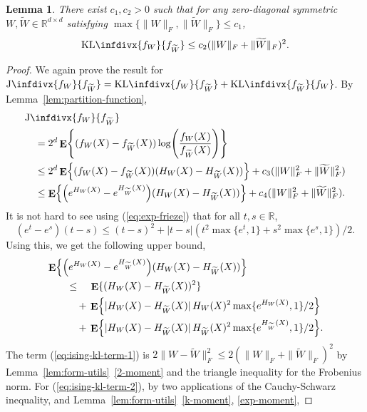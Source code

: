 \documentclass[letterpaper]{amsart}
\newcommand{\infdiv}{\mathrm{KL}\infdivx}
\newcommand{\sinfdiv}{\mathrm{J}\infdivx}
\newcommand{\R}{\mathbb{R}}
\DeclareMathOperator{\E}{\mathbf{E}}
\let\originalleft\left
\let\originalright\right
\def\left#1{\mathopen{}\originalleft#1}
\def\right#1{\originalright#1\mathclose{}}
\newcommand{\eqlabel}[1]{\label{eq:#1}}
\renewcommand{\eqref}[1]{(\ref{eq:#1})}
\numberwithin{thm}{section}
\newtheorem{lem}[thm]{Lemma}{\bfseries}{\itshape}
\newcommand{\lemlabel}[1]{\label{lem:#1}}
\newcommand{\lemref}[1]{Lemma~\ref{lem:#1}}
\theoremstyle{definition}
\theoremstyle{plain}
\renewcommand{\tilde}[1]{\widetilde{#1}}
\begin{document}
\begin{lem}\lemlabel{ising-kl}
  There exist $c_1, c_2 > 0$ such that for any zero-diagonal symmetric
  $W, \tilde{W} \in \R^{d \times d}$ satisfying
  $\max\{\|W\|_F, \|\tilde{W}\|_F\} \le c_1$,
  \[
  	\infdiv{f_W}{f_{\tilde{W}}} \le c_2 (\|W\|_F + \|\tilde{W}\|_F)^2 .
  \]
\end{lem}
\begin{proof}
  We again prove the result for
  $\sinfdiv{f_W}{f_{\tilde{W}}} = \infdiv{f_W}{f_{\tilde{W}}} +
  \infdiv{f_{\tilde{W}}}{f_W}$. By \lemref{partition-function},
  \begin{align*}
    &\sinfdiv{f_W}{f_{\tilde{W}}} \\
    &\quad = 2^d \E\left\{ (f_W(X) - f_{\tilde{W}}(X)) \log\left(\frac{f_W(X)}{f_{\tilde{W}}(X)}\right)\right\} \\
                                 &\quad \le 2^d \E\left\{ (f_W(X) - f_{\tilde{W}}(X)) (H_W(X) - H_{\tilde{W}}(X)) \right\}  + c_3 (\|W\|_F^2 + \|\tilde{W}\|_F^2) \\
                                 &\quad \le \E\left\{ \left(e^{H_W(X)} - e^{H_{\tilde{W}}(X)} \right) (H_W(X) - H_{\tilde{W}}(X)) \right\} + c_4 (\|W\|_F^2 + \|\tilde{W}\|_F^2) .
  \end{align*}
  It is not hard to see using \eqref{exp-frieze} that for all
  $t, s \in \R$,
  \[
    (e^t - e^s) (t - s) \le (t - s)^2 + |t - s| \left(t^2 \max\{e^t, 1\} + s^2 \max\{e^s, 1\}\right)/2 .
  \]
  Using this, we get the following upper bound,
  \begin{align}
    &\E\left\{ \left(e^{H_W(X)} - e^{H_{\tilde{W}}(X)} \right) (H_W(X) - H_{\tilde{W}}(X)) \right\} \notag \\
    &\qquad \le \hspace{1.1em} \E\{(H_W(X) - H_{\tilde{W}}(X))^2\} \eqlabel{ising-kl-term-1} \\
    &\qquad \quad +\, \E\left\{ |H_W(X) - H_{\tilde{W}}(X)| \, H_W(X)^2 \max\{e^{H_W(X)}, 1\}/2\right\} \eqlabel{ising-kl-term-2} \\
    &\qquad \quad +\, \E\left\{ |H_W(X) - H_{\tilde{W}}(X)| \, H_{\tilde{W}}(X)^2 \max\{e^{H_{\tilde{W}}(X)}, 1\} /2 \right\} . \eqlabel{ising-kl-term-3}
  \end{align}
  The term \eqref{ising-kl-term-1} is
  $2 \|W - \tilde{W}\|_F^2 \le 2 (\|W\|_F + \|\tilde{W}\|_F)^2$ by
  \lemref{form-utils}~\ref{2-moment} and the triangle inequality for the Frobenius norm. For \eqref{ising-kl-term-2}, by two applications of the
  Cauchy-Schwarz inequality, and \lemref{form-utils}~\ref{k-moment}, \ref{exp-moment},

\end{proof}
\end{document}
